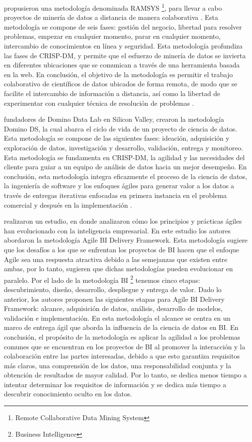 \cite{Mladenic2012} propusieron una metodología denominada RAMSYS \footnote{Remote Collaborative Data Mining System}, para llevar a cabo proyectos de minería de datos a distancia de manera colaborativa . Esta metodología se compone de seis fases: gestión del negocio,  libertad para resolver problemas, empezar en cualquier momento, parar en cualquier momento, intercambio de conocimientos en línea y seguridad. Esta metodología profundiza las fases de CRISP-DM, y permite que el esfuerzo de minería de datos se invierta en diferentes ubicaciones que se comunican a través de una herramienta basada en la web. En conclusión, el objetivo de la metodología es permitir el trabajo colaborativo de científicos de datos ubicados de forma remota, de modo que se facilite el intercambio de información a distancia, así como la libertad de experimentar con cualquier técnica de resolución de problemas \cite{Martinez2021}.

\cite{Elprin2022} fundadores de Domino Data Lab en Silicon Valley, crearon la metodología Domino DS, la cual abarca el ciclo de vida de un proyecto de ciencia de datos. Esta metodología se compone de las siguientes fases: ideación, adquisición y exploración de datos, investigación y desarrollo, validación, entrega y monitoreo. Esta metodología se fundamenta en CRISP-DM, la agilidad y las necesidades del cliente para guiar a un equipo de análisis de datos hacia un mejor desempeño. En conclusión, esta metodología integra eficazmente el proceso de la ciencia de datos, la ingeniería de software y los enfoques ágiles para generar valor a los datos a través de entregas iterativas enfocadas en primera instancia en el problema comercial y después en la implementación \cite{Martinez2021}.

\cite{Larson2016} realizaron un estudio, en donde analizaron cómo los principios y prácticas ágiles han evolucionado con la inteligencia empresarial. En este estudio los autores abordaron la metodología Agile BI Delivery Framework. Esta metodología sugiere que los desafíos a los que se enfrentan los proyectos de BI hacen que el enfoque Agile sea una respuesta atractiva debido a las semejanzas que existen entre ambas, por lo tanto, sugieren que dichas metodologías pueden evolucionar en paralelo. Por el lado de la metodología BI \footnote{Business Intelligence} tenemos cinco etapas: descubrimiento, diseño, desarrollo, despliegue y entrega de valor. Dado lo anterior, los autores proponen las siguientes etapas para Agile BI Delivery Framework: alcance, adquisición de datos, análisis, desarrollo de modelos, validación e implementación. En esta metodología el alcance se centra en un marco de entrega ágil que aborda la influencia de la ciencia de datos en BI. En conclusión, el propósito de la metodología es aplicar la agilidad a los problemas comunes que se encuentran en los proyectos de BI al promover la interacción y la colaboración entre las partes interesadas, debido a que esto garantiza requisitos más claros, una comprensión de los datos, una responsabilidad conjunta y la obtención de resultados de mayor calidad. Por lo tanto, se dedica menos tiempo a intentar determinar los requisitos de información y se dedica más tiempo a descubrir conocimiento oculto en los datos.

